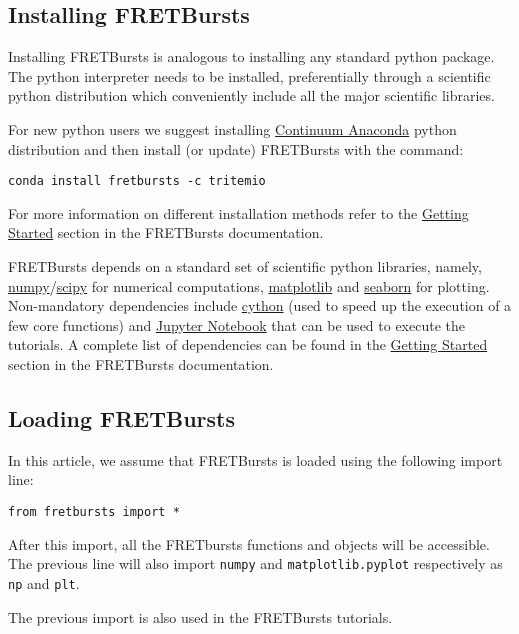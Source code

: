 \subsection{Installing FRETBursts}
\label{sec:install}
Installing FRETBursts is analogous to installing any standard python
package. The python interpreter needs to be installed, preferentially
through a scientific python distribution which conveniently include 
all the major scientific libraries.

For new python users we suggest installing 
\href{https://store.continuum.io/cshop/anaconda/}{Continuum Anaconda}
python distribution and then install (or update) FRETBursts with the command:

\begin{verbatim}
conda install fretbursts -c tritemio
\end{verbatim}

For more information on different installation methods refer to the 
\href{http://fretbursts.readthedocs.org/en/latest/getting_started.html}{Getting Started}
section in the FRETBursts documentation.

FRETBursts depends on a standard set of scientific 
python libraries, namely, \href{http://www.numpy.org/}{numpy}/\href{http://www.scipy.org/}{scipy} for numerical computations, 
\href{http://matplotlib.org/}{matplotlib} and \href{http://stanford.edu/~mwaskom/software/seaborn/}{seaborn} for plotting. Non-mandatory dependencies include \href{http://cython.org/}{cython} (used to speed up the execution of a few core functions)
and \href{http://ipython.org/notebook.html}{Jupyter Notebook} that can be used
to execute the tutorials.
A complete list of dependencies can be found in the 
\href{http://fretbursts.readthedocs.org/en/latest/getting_started.html}{Getting Started}
section in the FRETBursts documentation.

\subsection{Loading FRETBursts}
\label{sec:import}
In this article, we assume that FRETBursts is loaded using the following 
import line:

\begin{verbatim}
from fretbursts import *
\end{verbatim}

After this import, all the FRETbursts functions and objects will be accessible.
The previous line will also import \verb|numpy| and \verb|matplotlib.pyplot|
respectively as \verb|np| and \verb|plt|.

The previous import is also used in the FRETBursts tutorials.